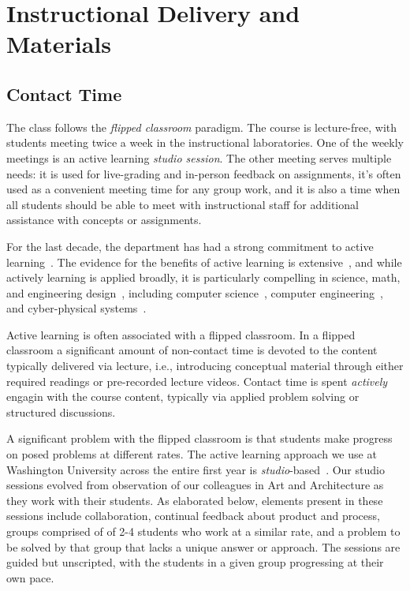 \section{Instructional Delivery and Materials}
\label{sec:delivery}

\subsection{Contact Time}

The class follows the \emph{flipped classroom} paradigm.  The course is lecture-free, with students meeting twice a week in the instructional laboratories.   One of the weekly meetings is an active learning \emph{studio session}.  The other meeting serves multiple needs: it is used for live-grading and in-person feedback on assignments, it's often used as a convenient meeting time for any group work, and it is also a time when all students should be able to meet with instructional staff for additional assistance with concepts or assignments.

For the last decade, the department has had a strong commitment to active learning~\cite{scbggg10,sgcggt10}. The evidence for the benefits of active learning is extensive~\cite{jjs98,lst99,Prince04,rss97}, and while actively learning is applied broadly, it is particularly compelling in science, math, and engineering design~\cite{Freeman14,lst99,Hake98,Byerley01,kb06}, including computer science~\cite{McConnell96,tlb01,skltc10,ag13}, computer engineering~\cite{hmdpa04,sr02}, and cyber-physical systems~\cite{me14,mmy16}.

Active learning is often associated with a flipped classroom.  In a flipped classroom a significant amount of non-contact time is devoted to the content typically delivered via lecture, i.e., introducing conceptual material through either required readings or pre-recorded lecture videos.  Contact time is spent \emph{actively} engagin with the course content, typically via applied problem solving or structured discussions.

A significant problem with the flipped classroom is that students make progress on posed problems at different rates. The active learning approach we use at Washington University across the entire first year is \emph{studio}-based~\cite{hnc08}. Our studio sessions evolved from observation of our colleagues in Art and Architecture as they work with their students.  As elaborated below, elements present in these sessions include collaboration, continual feedback about product and process, groups comprised of of 2-4 students who work at a similar rate, and a problem to be solved by that group that lacks a unique answer or approach.  The sessions are guided but unscripted, with the students in a given group progressing at their own pace.

